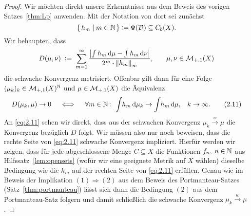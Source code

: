 \documentclass[../main/main.tex]{subfiles}
\begin{document}
	\begin{proof}
		Wir möchten direkt unsere Erkenntnisse aus dem Beweis des vorigen 
		Satzes~\ref{thm:Lp} anwenden. Mit der Notation von dort sei zunächst 
		\[\left\{\, h_m \; \middle| \; m \in \mathbb{N} \,\right\} \vcentcolon = \Phi(\mathcal{D}) \subseteq C_b(X) \text{.}\] 
		Wir behaupten, dass
		\[D(\mu, \nu) \; \vcentcolon = \; \sum_{m=1}^{\infty} \frac{\left| \int_{} \, h_m \, \mathrm{d}\mu - 
			\int_{} \, h_m \, \mathrm{d}\nu \right|}{2^m \cdot \left\lVert h_m\right\rVert_\infty} \text{,} 
			\qquad \mu, \nu \in \mathcal{M}_{+,1}(X) \]
		die schwache Konvergenz metrisiert. Offenbar gilt dann für eine Folge 
		$(\mu_k)_k \in \mathcal{M}_{+,1}(X)^{\mathbb{N}}$ und $\mu \in \mathcal{M}_{+,1}(X)$ die 
		Äquivalenz
		\[ D(\mu_k, \mu) \to 0 \quad \iff \quad \forall m \in \mathbb{N}: \; 
			\int_{} \, h_m \, \mathrm{d}\mu_k \to \int_{} \, h_m \, \mathrm{d}\mu\text{,} 
			\quad k \to \infty \text{.} \label{eq:2.11} \tag{2.11} \]
		An \eqref{eq:2.11} sehen wir direkt, dass aus der schwachen Konvergenz 
		$\mu_k \xrightarrow{w} \mu$ die Konvergenz bezüglich $D$ folgt. Wir 
		müssen also nur noch beweisen, dass die rechte Seite von \eqref{eq:2.11} 
		schwache Konvergenz impliziert. Hierfür werden wir zeigen, dass für jede 
		abgeschlossene Menge $C \subseteq X$ die Funktionen $f_n, \; n \in \mathbb{N}$ aus 
		Hilfssatz~\ref{lem:opensets} (wofür wir eine geeignete Metrik auf $X$ wählen) 
		dieselbe Bedingung wie die $h_m$ auf der rechten Seite von \eqref{eq:2.11} 
		erfüllen. Genau wie im Beweis der Implikation $(1) \Rightarrow (2)$ aus dem 
		Beweis des Portmanteau-Satzes (Satz~\ref{thm:portmanteau}) lässt sich dann 
		die Bedingung $(2)$ aus dem Portmanteau-Satz folgern und damit schließlich 
		die schwache Konvergenz $\mu_k \xrightarrow{w} \mu$.
		

\end{proof}
\end{document}
